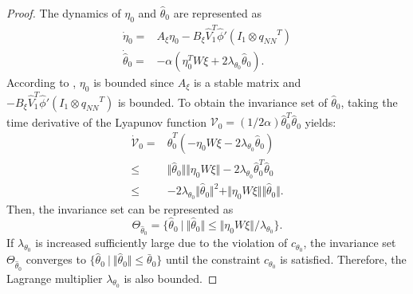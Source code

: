 \documentclass[letterpaper, 10 pt, conference]{ieeeconf}  %
\newtheorem{remark}{Remark}
\begin{document}
\begin{proof}
The dynamics of $\eta_0$ and $\hat\theta_0$ are represented as
\begin{equation*}
    \begin{aligned}     
        \dot\eta_0 =& 
        A_\xi\eta_0 -B_\xi 
        \hat V_1^T\hat\phi'(I_1\otimes {q_{NN}}^T)
        \\
        \dot{\hat\theta}_0
        =&
        -\alpha 
        (
            \eta_0^TW\xi+2\lambda_{\theta_0} \hat\theta_0
        )
        .
    \end{aligned}
\end{equation*}
According to \cite[Chap.~4 T.~1.9]{RN32}, $\eta_0$ is bounded since $A_\xi$ is a stable matrix and $-B_\xi\hat V_1^T\hat\phi'(I_1\otimes {q_{NN}}^T)$ is bounded.
To obtain the invariance set of $\hat\theta_0$, taking the time derivative of the Lyapunov function $\mathcal V_0=(1/2\alpha)\hat\theta_0^T\hat\theta_0$ yields:
\begin{equation*}
    \begin{aligned}
        \dot {\mathcal V}_0 =& 
        \hat\theta_0^T (-\eta_0W\xi -2\lambda_{\theta_0}\hat\theta_0)
        \\
        \le &
        \Vert\hat\theta_0\Vert \Vert \eta_0W\xi\Vert -2\lambda_{\theta_0} \hat\theta_0^T\hat\theta_0
        \\
        \le &
        -2\lambda_{\theta_0} \Vert\hat\theta_0\Vert^2 + \Vert \eta_0W\xi\Vert \Vert \hat\theta_0\Vert 
        .
    \end{aligned}
\end{equation*}
Then, the invariance set can be represented as 
\begin{equation*}
    \Theta_{\hat\theta_0} =
    \{
        \hat\theta_0\ \vert \ \Vert\hat\theta_0\Vert \le \Vert\eta_0W\xi\Vert/\lambda_{\theta_0}
    \}
    .    
\end{equation*}
If $\lambda_{\theta_0}$ is increased sufficiently large due to the violation of $c_{\theta_0}$, the invariance set $\Theta_{\hat\theta_0}$ converges to $\{\hat\theta_0\ \vert \ \Vert\hat\theta_0\Vert \le \bar\theta_0\}$ until the constraint $c_{\theta_0}$ is satisfied.
Therefore, the Lagrange multiplier $\lambda_{\theta_0}$ is also bounded.

\end{proof}

\end{document}
